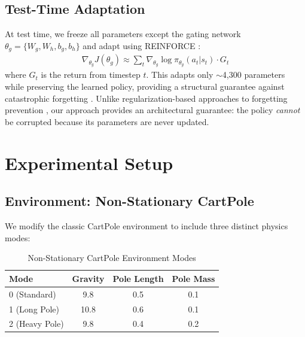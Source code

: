 \documentclass{article}
\begin{document}
\subsection{Test-Time Adaptation}

At test time, we freeze all parameters except the gating network $\theta_g = \{W_g, W_h, b_g, b_h\}$ and adapt using REINFORCE \citep{schulman2017proximal}:
\begin{align}
    \nabla_{\theta_g} J(\theta_g) \approx \sum_t \nabla_{\theta_g} \log \pi_{\theta_g}(a_t|s_t) \cdot G_t
\end{align}
where $G_t$ is the return from timestep $t$. This adapts only $\sim$4,300 parameters while preserving the learned policy, providing a structural guarantee against catastrophic forgetting \citep{kirkpatrick2017overcoming, rusu2016progressive}. Unlike regularization-based approaches to forgetting prevention \citep{zenke2017continual, aljundi2018memory}, our approach provides an architectural guarantee: the policy \emph{cannot} be corrupted because its parameters are never updated.

\section{Experimental Setup}
\label{sec:setup}

\subsection{Environment: Non-Stationary CartPole}

We modify the classic CartPole environment \citep{brockman2016gym} to include three distinct physics modes:

\begin{table}[h]
\centering
\caption{Non-Stationary CartPole Environment Modes}
\label{tab:env_modes}
\begin{tabular}{@{}lccc@{}}
\toprule
\textbf{Mode} & \textbf{Gravity} & \textbf{Pole Length} & \textbf{Pole Mass} \\
\midrule
0 (Standard) & 9.8 & 0.5 & 0.1 \\
1 (Long Pole) & 10.8 & 0.6 & 0.1 \\
2 (Heavy Pole) & 9.8 & 0.4 & 0.2 \\
\bottomrule
\end{tabular}
\end{table}
\end{document}
